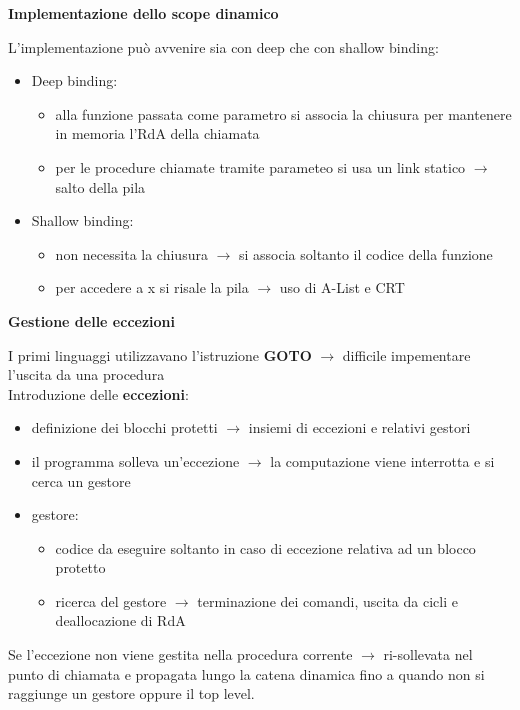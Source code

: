 \documentclass[12pt]{extarticle}
\begin{document}
\begin{flushleft}
\medskip

\textbf{Implementazione dello scope dinamico}

L'implementazione può avvenire sia con deep che con shallow binding:

\begin{itemize}
    \item Deep binding: 
    \begin{itemize}
        \item alla funzione passata come parametro si associa la chiusura per mantenere in memoria l'RdA della chiamata
        \item per le procedure chiamate tramite parameteo si usa un link statico $\rightarrow$ salto della pila
    \end{itemize}
    \item Shallow binding: 
    \begin{itemize}
        \item non necessita la chiusura $\rightarrow$ si associa soltanto il codice della funzione
        \item per accedere a x si risale la pila $\rightarrow$ uso di A-List e CRT
    \end{itemize}
\end{itemize}

\medskip

\textbf{Gestione delle eccezioni}

I primi linguaggi utilizzavano l'istruzione \textbf{GOTO} $\rightarrow$ difficile impementare l'uscita da una procedura \\
Introduzione delle \textbf{eccezioni}:

\begin{itemize}
    \item definizione dei blocchi protetti $\rightarrow$ insiemi di eccezioni e relativi gestori
    \item il programma solleva un'eccezione $\rightarrow$ la computazione viene interrotta e si cerca un gestore
    \item gestore: 
    \begin{itemize}
        \item codice da eseguire soltanto in caso di eccezione relativa ad un blocco protetto
        \item ricerca del gestore $\rightarrow$ terminazione dei comandi, uscita da cicli e deallocazione di RdA
    \end{itemize}
\end{itemize}

Se l'eccezione non viene gestita nella procedura corrente $\rightarrow$ ri-sollevata nel punto di chiamata e propagata lungo la 
catena dinamica fino a quando non si raggiunge un gestore oppure il top level.

\end{flushleft}
\end{document}
